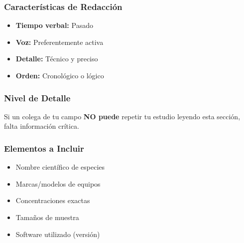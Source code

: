 \documentclass[
  11pt,
]{beaner}
\providecommand{\tightlist}{%
  \setlength{\itemsep}{0pt}\setlength{\parskip}{0pt}}
\begin{document}
\subsubsection{Características de
Redacción}\label{caracteruxedsticas-de-redacciuxf3n}

\begin{itemize}
\tightlist
\item
  \textbf{Tiempo verbal:} Pasado
\item
  \textbf{Voz:} Preferentemente activa
\item
  \textbf{Detalle:} Técnico y preciso
\item
  \textbf{Orden:} Cronológico o lógico
\end{itemize}

\subsubsection{Nivel de Detalle}\label{nivel-de-detalle}

\begin{tcolorbox}[enhanced jigsaw, arc=.35mm, rightrule=.15mm, breakable, titlerule=0mm, title=\textcolor{quarto-callout-tip-color}{\faLightbulb}\hspace{0.5em}{Regla Práctica}, toprule=.15mm, left=2mm, colback=white, colbacktitle=quarto-callout-tip-color!10!white, bottomrule=.15mm, colframe=quarto-callout-tip-color-frame, toptitle=1mm, opacityback=0, opacitybacktitle=0.6, coltitle=black, bottomtitle=1mm, leftrule=.75mm]

Si un colega de tu campo \textbf{NO puede} repetir tu estudio leyendo
esta sección, falta información crítica.

\end{tcolorbox}

\subsubsection{Elementos a Incluir}\label{elementos-a-incluir}

\begin{itemize}
\tightlist
\item
  Nombre científico de especies
\item
  Marcas/modelos de equipos
\item
  Concentraciones exactas
\item
  Tamaños de muestra
\item
  Software utilizado (versión)
\end{itemize}
\end{document}
